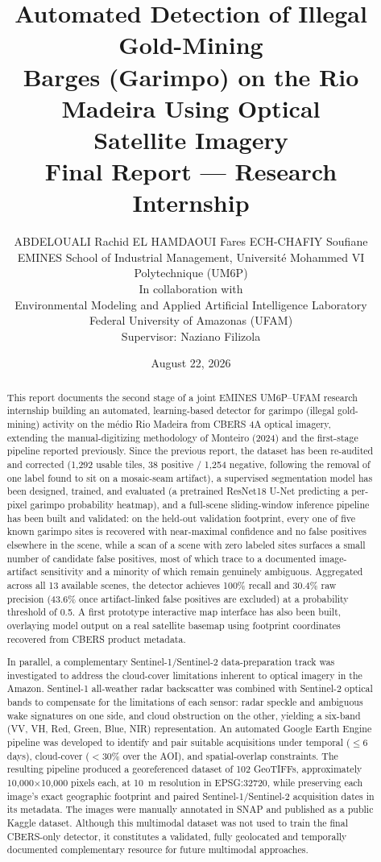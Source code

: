 \documentclass[11pt,a4paper]{article}
\title{\textbf{Automated Detection of Illegal Gold-Mining\\
Barges (Garimpo) on the Rio Madeira Using Optical\\
Satellite Imagery}\\[0.3cm]
\large Final Report --- Research Internship}
\author{
ABDELOUALI Rachid \quad EL HAMDAOUI Fares \quad ECH-CHAFIY Soufiane\\[0.15cm]
\small EMINES School of Industrial Management, Universit\'e Mohammed VI Polytechnique (UM6P)\\[0.3cm]
\normalsize In collaboration with\\
\small Environmental Modeling and Applied Artificial Intelligence Laboratory\\
\small Federal University of Amazonas (UFAM)\\[0.3cm]
\small Supervisor: Naziano Filizola
}
\date{August 22, 2026}
\begin{document}
\maketitle

\begin{abstract}

This report documents the second stage of a joint EMINES UM6P--UFAM research
internship building an automated, learning-based detector for garimpo (illegal
gold-mining) activity on the m\'edio Rio Madeira from CBERS 4A optical imagery,
extending the manual-digitizing methodology of Monteiro (2024) and the
first-stage pipeline reported previously. Since the previous report, the dataset
has been re-audited and corrected (1,292 usable tiles, 38 positive / 1,254
negative, following the removal of one label found to sit on a mosaic-seam
artifact), a supervised segmentation model has been designed, trained, and
evaluated (a pretrained ResNet18 U-Net predicting a per-pixel garimpo
probability heatmap), and a full-scene sliding-window inference pipeline has
been built and validated: on the held-out validation footprint, every one of
five known garimpo sites is recovered with near-maximal confidence and no false
positives elsewhere in the scene, while a scan of a scene with zero labeled
sites surfaces a small number of candidate false positives, most of which
trace to a documented image-artifact sensitivity and a minority of which remain
genuinely ambiguous. Aggregated across all 13 available scenes, the detector
achieves 100\% recall and 30.4\% raw precision (43.6\% once artifact-linked
false positives are excluded) at a probability threshold of 0.5. A first
prototype interactive map interface has also been built, overlaying model
output on a real satellite basemap using footprint coordinates recovered from
CBERS product metadata.

In parallel, a complementary Sentinel-1/Sentinel-2 data-preparation track was
investigated to address the cloud-cover limitations inherent to optical imagery
in the Amazon. Sentinel-1 all-weather radar backscatter was combined with
Sentinel-2 optical bands to compensate for the limitations of each sensor:
radar speckle and ambiguous wake signatures on one side, and cloud obstruction
on the other, yielding a six-band (VV, VH, Red, Green, Blue, NIR)
representation. An automated Google Earth Engine pipeline was developed to
identify and pair suitable acquisitions under temporal ($\leq 6$ days),
cloud-cover ($<30\%$ over the AOI), and spatial-overlap constraints. The
resulting pipeline produced a georeferenced dataset of 102 GeoTIFFs,
approximately 10,000$\times$10,000 pixels each, at 10~m resolution in
EPSG:32720, while preserving each image's exact geographic footprint and
paired Sentinel-1/Sentinel-2 acquisition dates in its metadata. The images
were
manually annotated in SNAP and published as a public Kaggle dataset. Although
this multimodal dataset was not used to train the final CBERS-only detector,
it constitutes a validated, fully geolocated and temporally documented
complementary resource for future multimodal approaches.


\end{abstract}
\end{document}
